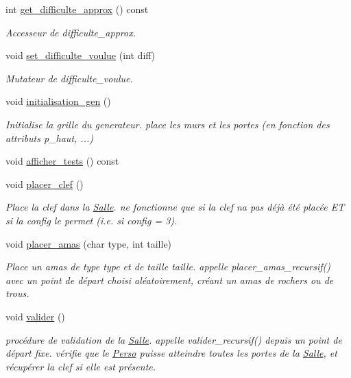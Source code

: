 \begin{DoxyCompactItemize}
int \hyperlink{classSalleGen_a130ad804784a2bf23566c34821405908}{get\+\_\+difficulte\+\_\+approx} () const 
\begin{DoxyCompactList}\small\item\em Accesseur de {\itshape difficulte\+\_\+approx}. \end{DoxyCompactList}\item 
void \hyperlink{classSalleGen_a56ad6729e07d2dc10d38ca3f49ad2b0d}{set\+\_\+difficulte\+\_\+voulue} (int diff)
\begin{DoxyCompactList}\small\item\em Mutateur de {\itshape difficulte\+\_\+voulue}. \end{DoxyCompactList}\item 
void \hyperlink{classSalleGen_af0886287a6e35eef33706ac287b1a534}{initialisation\+\_\+gen} ()
\begin{DoxyCompactList}\small\item\em Initialise la {\itshape grille} du generateur. place les murs et les portes (en fonction des attributs p\+\_\+haut, ...) \end{DoxyCompactList}\item 
void \hyperlink{classSalleGen_a04804bb621939bf1f1610a775cffd76e}{afficher\+\_\+tests} () const 
\item 
void \hyperlink{classSalleGen_a10b76face853353421bec73ac2ad8340}{placer\+\_\+clef} ()
\begin{DoxyCompactList}\small\item\em Place la clef dans la \hyperlink{classSalle}{Salle}. ne fonctionne que si la clef n\textquotesingle{}a pas déjà été placée ET si la config le permet (i.\+e. si config = 3). \end{DoxyCompactList}\item 
void \hyperlink{classSalleGen_a72b440eb325c77e6578aa379a9765028}{placer\+\_\+amas} (char type, int taille)
\begin{DoxyCompactList}\small\item\em Place un amas de type {\itshape type} et de taille {\itshape taille}. appelle placer\+\_\+amas\+\_\+recursif() avec un point de départ choisi aléatoirement, créant un amas de rochers ou de trous. \end{DoxyCompactList}\item 
void \hyperlink{classSalleGen_a2e7e291757dac1170857f0da0d5bbb7b}{valider} ()
\begin{DoxyCompactList}\small\item\em procédure de validation de la \hyperlink{classSalle}{Salle}. appelle valider\+\_\+recursif() depuis un point de départ fixe. vérifie que le \hyperlink{classPerso}{Perso} puisse atteindre toutes les portes de la \hyperlink{classSalle}{Salle}, et récupérer la clef si elle est présente. \end{DoxyCompactList}\item 

\end{DoxyCompactItemize}
